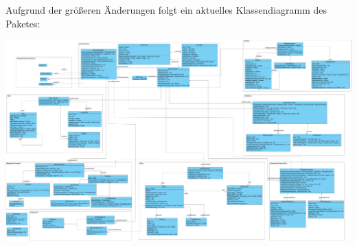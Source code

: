 Aufgrund der gr\"{o}\ss eren \"{A}nderungen folgt ein aktuelles Klassendiagramm des Paketes:\\
\begin{landscape}
\includegraphics[width=0.85\paperheight]{images/coregui.pdf}
\end{landscape}